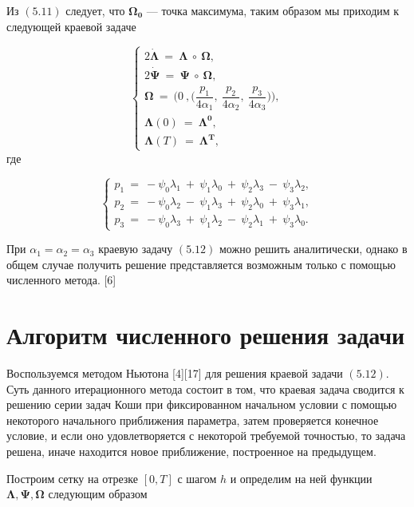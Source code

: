 \documentclass[14pt]{extreport}
\begin{document}
Из  $(5.11)$ следует, что $\boldsymbol{\Omega_0}$ --- точка максимума, таким образом мы приходим к следующей краевой задаче

\begin{equation}
\begin{cases}
2\boldsymbol{\dot{\Lambda}}\ =\ \boldsymbol\Lambda\ \circ\ \boldsymbol\Omega, \\
2\boldsymbol{\dot{\Psi}}\ =\ \boldsymbol\Psi\ \circ\ \boldsymbol\Omega, \\
\boldsymbol\Omega\ =\ \bigg(0\ ,\bigg(\dfrac{p_1}{4\alpha_1},\ \dfrac{p_2}{4\alpha_2},\ \dfrac{p_3}{4\alpha_3}\bigg) \bigg), \\
\boldsymbol\Lambda(0)\ =\ \boldsymbol{\Lambda^0}, \\
\boldsymbol\Lambda(T)\ =\ \boldsymbol{\Lambda^T},
 \end{cases}
\end{equation}
где 

\begin{equation}
\begin{cases}
p_1\ =\ - \psi_0\lambda_1\ +\ \psi_1\lambda_0\ +\ \psi_2\lambda_3\ -\ \psi_3\lambda_2, \\
p_2\ =\ - \psi_0\lambda_2\ -\ \psi_1\lambda_3\ +\ \psi_2\lambda_0\ +\ \psi_3\lambda_1, \\
p_3\ =\ - \psi_0\lambda_3\ +\ \psi_1\lambda_2\ -\ \psi_2\lambda_1\ +\ \psi_3\lambda_0.
 \end{cases}
\end{equation}

При $\alpha_1 = \alpha_2 = \alpha_3$ краевую задачу $(5.12)$ можно решить аналитически, однако в общем случае получить решение
представляется возможным только с помощью численного метода. [6]

\newpage

\chapter{Алгоритм численного решения задачи}
Воспользуемся методом Ньютона [4][17] для решения краевой задачи $(5.12)$. Суть данного итерационного метода состоит в том, что краевая задача сводится
к решению серии задач Коши при фиксированном начальном условии с помощью некоторого начального приближения параметра,
затем проверяется конечное условие, и если оно удовлетворяется с некоторой требуемой точностью, то задача решена, иначе находится новое приближение,
построенное на предыдущем.

Построим сетку на отрезке $[0, T]$ с шагом $h$ и определим на ней функции $\boldsymbol\Lambda, \boldsymbol\Psi, \boldsymbol\Omega$  следующим образом
\end{document}
